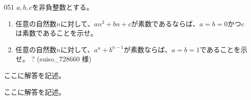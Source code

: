 \begin{prob}{051}{}{}
 $a, b, c$を非負整数とする。
 \begin{enumerate}
  \item 任意の自然数$n$に対して、$an^2+bn+c$が素数であるならば、$a=b=0$かつ$c$は素数であることを示せ。 
  \item 任意の自然数$n$に対して、$a^n+b^{n-1}$が素数ならば、$a=b=1$であることを示せ。 \hosi ? (suiso\_728660 様)
 \end{enumerate}
\end{prob}
ここに解答を記述。

ここに解答を記述。
